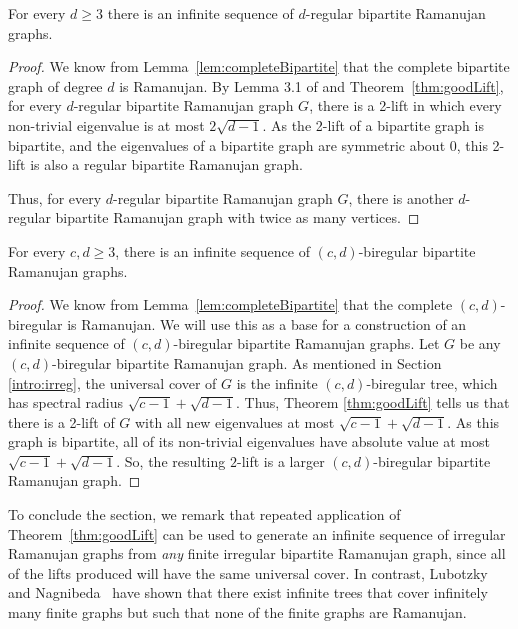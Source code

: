 \documentclass[11pt]{article}
\begin{document}
\begin{theorem}\label{thm:Ramanujan}
For every $d \geq 3$ there is an infinite sequence of 
  $d$-regular bipartite Ramanujan graphs.
\end{theorem}
\begin{proof}
We know from Lemma~\ref{lem:completeBipartite} that the
   complete bipartite graph of degree $d$ is Ramanujan.
By Lemma 3.1 of \cite{BiluLinial}
  and
 Theorem~\ref{thm:goodLift},
  for every $d$-regular bipartite Ramanujan graph $G$,
  there is a 2-lift 
  in which every non-trivial eigenvalue
  is at most $2 \sqrt{d-1}$.
As the
  2-lift of a bipartite graph is bipartite,
  and the eigenvalues of a bipartite graph
  are symmetric about $0$,
  this 2-lift is also a regular bipartite Ramanujan graph.

Thus, for every $d$-regular bipartite Ramanujan graph $G$,
  there is another $d$-regular bipartite Ramanujan graph
  with twice as many vertices.
\end{proof}

\begin{theorem}\label{thm:Irreg}
For every $c,d\ge 3$, there is an infinite sequence of $(c,d)$-biregular
  bipartite Ramanujan graphs.
\end{theorem}
\begin{proof}
We know from Lemma~\ref{lem:completeBipartite} that the
   complete $(c,d)$-biregular is Ramanujan.
We will use this as a base for a construction of an infinite sequence of $(c,d)$-biregular bipartite Ramanujan graphs.
Let $G$ be any $(c,d)$-biregular bipartite Ramanujan graph.
As mentioned in Section \ref{intro:irreg}, the universal cover of $G$ is the infinite $(c,d)$-biregular tree,
  which has spectral radius $\sqrt{c-1}+\sqrt{d-1}$.
Thus, Theorem \ref{thm:goodLift} tells us that there is a 2-lift of $G$ with all new
  eigenvalues at most $\sqrt{c-1}+\sqrt{d-1}$.
As this graph is bipartite, all of its non-trivial eigenvalues
  have absolute value at most $\sqrt{c-1}+\sqrt{d-1}$.
So, the resulting $2$-lift is a larger $(c,d)$-biregular bipartite
  Ramanujan graph.
\end{proof}

To conclude the section, we remark that repeated application of Theorem~\ref{thm:goodLift} can be used to 
  generate an infinite sequence of irregular Ramanujan graphs from {\em any} finite irregular bipartite Ramanujan graph, since
  all of the lifts produced will have 
  the same universal cover.
In contrast, Lubotzky and Nagnibeda~\cite{lubotzky1998not} have shown that there exist infinite trees that cover infinitely many finite graphs but
  such that none of the finite graphs are Ramanujan.
\end{document}
